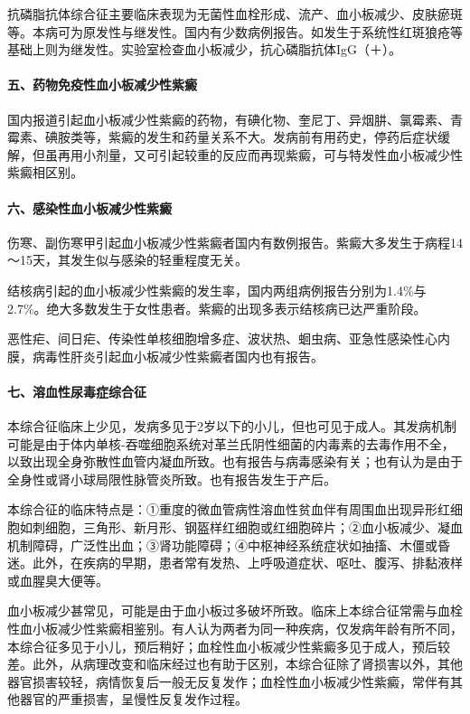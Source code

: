 抗磷脂抗体综合征主要临床表现为无菌性血栓形成、流产、血小板减少、皮肤瘀斑等。本病可为原发性与继发性。国内有少数病例报告。如发生于系统性红斑狼疮等基础上则为继发性。实验室检查血小板减少，抗心磷脂抗体IgG（＋）。

\paragraph{五、药物免疫性血小板减少性紫癜}

国内报道引起血小板减少性紫癜的药物，有碘化物、奎尼丁、异烟肼、氯霉素、青霉素、碘胺类等，紫癜的发生和药量关系不大。发病前有用药史，停药后症状缓解，但虽再用小剂量，又可引起较重的反应而再现紫癜，可与特发性血小板减少性紫癜相区别。

\paragraph{六、感染性血小板减少性紫癜}

伤寒、副伤寒甲引起血小板减少性紫癜者国内有数例报告。紫癜大多发生于病程14～15天，其发生似与感染的轻重程度无关。

结核病引起的血小板减少性紫癜的发生率，国内两组病例报告分别为1.4\%与2.7\%。绝大多数发生于女性患者。紫癜的出现多表示结核病已达严重阶段。

恶性疟、间日疟、传染性单核细胞增多症、波状热、蛔虫病、亚急性感染性心内膜，病毒性肝炎引起血小板减少性紫癜者国内也有报告。

\paragraph{七、溶血性尿毒症综合征}

本综合征临床上少见，发病多见于2岁以下的小儿，但也可见于成人。其发病机制可能是由于体内单核-吞噬细胞系统对革兰氏阴性细菌的内毒素的去毒作用不全，以致出现全身弥散性血管内凝血所致。也有报告与病毒感染有关；也有认为是由于全身性或肾小球局限性脉管炎所致。也有报告发生于产后。

本综合征的临床特点是：①重度的微血管病性溶血性贫血伴有周围血出现异形红细胞如刺细胞，三角形、新月形、钢盔样红细胞或红细胞碎片；②血小板减少、凝血机制障碍，广泛性出血；③肾功能障碍；④中枢神经系统症状如抽搐、木僵或昏迷。此外，在疾病的早期，患者常有发热、上呼吸道症状、呕吐、腹泻、排黏液样或血腥臭大便等。

血小板减少甚常见，可能是由于血小板过多破坏所致。临床上本综合征常需与血栓性血小板减少性紫癜相鉴别。有人认为两者为同一种疾病，仅发病年龄有所不同，本综合征多见于小儿，预后稍好；血栓性血小板减少性紫癜多见于成人，预后较差。此外，从病理改变和临床经过也有助于区别，本综合征除了肾损害以外，其他器官损害较轻，病情恢复后一般无反复发作；血栓性血小板减少性紫癜，常伴有其他器官的严重损害，呈慢性反复发作过程。

